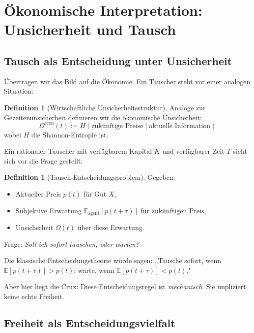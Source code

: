 \documentclass[a4paper, 12pt, twoside, openright]{report}
\theoremstyle{definition}
\newtheorem{definition}[theorem]{Definition}
\theoremstyle{definition}
\begin{document}
\section{Ökonomische Interpretation: Unsicherheit und Tausch}

\subsection{Tausch als Entscheidung unter Unsicherheit}

Übertragen wir das Bild auf die Ökonomie. Ein Tauscher steht vor einer analogen Situation:

\begin{definition}[Wirtschaftliche Unsicherheitsstruktur]
    Analoge zur Gezeitenunsicherheit definieren wir die ökonomische Unsicherheit:
    \begin{equation}
        \Omega^{\text{econ}}(t) := H\left(\text{zukünftige Preise} \mid \text{aktuelle Information}\right)
    \end{equation}
    wobei $H$ die Shannon-Entropie ist.
\end{definition}

Ein rationaler Tauscher mit verfügbarem Kapital $K$ und verfügbarer Zeit $T$ sieht sich vor die Frage gestellt:

\begin{definition}[Tausch-Entscheidungsproblem]
    Gegeben:
    \begin{itemize}
        \item Aktueller Preis $p(t)$ für Gut $X$,
        \item Subjektive Erwartung $\mathbb{E}_{\text{agent}}[p(t+\tau)]$ für zukünftigen Preis,
        \item Unsicherheit $\Omega(t)$ über diese Erwartung.
    \end{itemize}
    Frage: \emph{Soll ich sofort tauschen, oder warten?}
\end{definition}

Die klassische Entscheidungstheorie würde sagen: „Tausche sofort, wenn $\mathbb{E}[p(t+\tau)] > p(t)$; warte, wenn $\mathbb{E}[p(t+\tau)] < p(t)$."

Aber hier liegt die Crux: Diese Entscheidungsregel ist \emph{mechanisch}. Sie impliziert keine echte Freiheit.

\subsection{Freiheit als Entscheidungsvielfalt}
\end{document}
